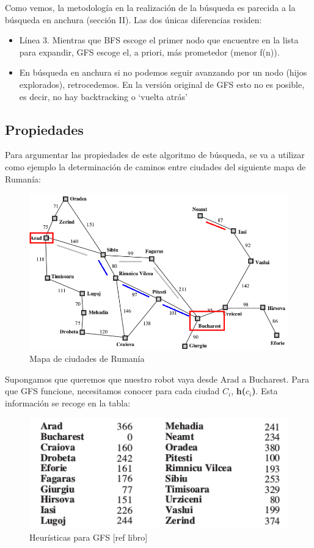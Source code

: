 \documentclass[conference]{IEEEtran}
\begin{document}
{Como vemos, la metodología en la realización de la búsqueda es parecida a la búsqueda en anchura (sección II). Las dos únicas diferencias residen:
\begin{itemize}

\item Línea 3. Mientras que BFS escoge el primer nodo que encuentre en la lista para expandir, GFS escoge el, a priori, más prometedor (menor f(n)).
\item En búsqueda en anchura si no podemos seguir avanzando por un nodo (hijos explorados), retrocedemos. En la versión original de GFS esto no es posible, es decir, no hay backtracking o `vuelta atrás'

\end{itemize}

\subsection{Propiedades}

Para argumentar las propiedades de este algoritmo de búsqueda, se va a utilizar como ejemplo la determinación de caminos entre ciudades del siguiente mapa de Rumanía:

\begin{figure}[H]
\centerline{\includegraphics[scale=0.3]{IMAGENES/RUMANIA.png}}
\caption{Mapa de ciudades de Rumanía}
\label{fig}
\end{figure}

Supongamos que queremos que nuestro robot vaya desde Arad a Bucharest. Para que GFS funcione, necesitamos conocer para cada ciudad $C_{i}$, \textbf{h($c_{i}$)}. Esta información se recoge en la tabla:

\begin{figure}[H]
\centerline{\includegraphics[scale=0.4]{IMAGENES/tablagfs.png}}
\caption{Heurísticas para GFS [ref libro]}
\label{fig}
\end{figure}

}
\end{document}
